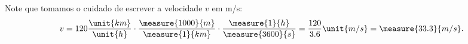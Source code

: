 \begin{question}
\begin{solution}
		Note que tomamos o cuidado de escrever a velocidade $v$ em \unit{m/s}:
		\begin{equation*}
			v = 120 \frac{\unit{km}}{\unit{h}} \cdot \frac{\measure{1000}{m}}{\measure{1}{km}} \cdot \frac{\measure{1}{h}}{\measure{3600}{s}} = \frac{120}{3.6} \unit{m/s} = \measure{33.3}{m/s}.
		\end{equation*}
	\end{solution}
\end{question}